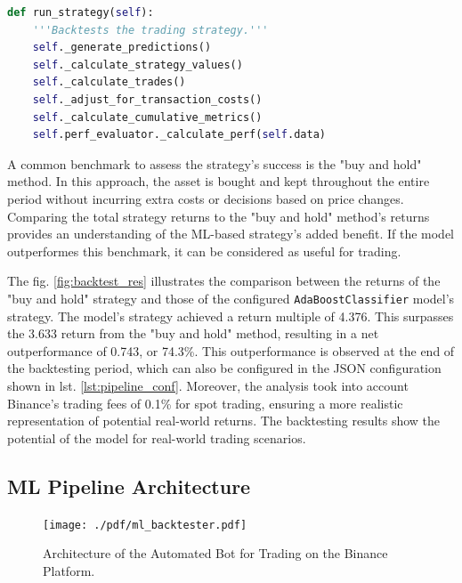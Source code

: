 \begin{lstlisting}[style=pythonstyle, language=Python, caption={\vspace*{1cm}Function of MlBacktester class for backtesting execution.},  captionpos=b, label=lst:add_features_function]
def run_strategy(self):
    '''Backtests the trading strategy.'''
    self._generate_predictions()
    self._calculate_strategy_values()
    self._calculate_trades()
    self._adjust_for_transaction_costs()
    self._calculate_cumulative_metrics()
    self.perf_evaluator._calculate_perf(self.data)

\end{lstlisting}

A common benchmark to assess the strategy's success is the "buy and hold" method.
In this approach, the asset is bought and kept throughout the entire period without incurring extra costs or decisions based on price changes.
Comparing the total strategy returns to the "buy and hold" method's returns provides an understanding of the ML-based strategy's added benefit.
If the model outperformes this benchmark, it can be considered as useful for trading.

The fig. \ref{fig:backtest_res} illustrates the comparison between the returns of the "buy and hold" strategy and those of the configured \texttt{AdaBoostClassifier} model's strategy.
The model's strategy achieved a return multiple of 4.376. This surpasses the 3.633 return from the "buy and hold" method, resulting in a net outperformance of 0.743, or 74.3\%.
This outperformance is observed at the end of the backtesting period, which can also be configured in the JSON configuration shown in lst. \ref{lst:pipeline_conf}.
Moreover, the analysis took into account Binance's trading fees of 0.1\% for spot trading, ensuring a more realistic representation of potential real-world returns.
The backtesting results show the potential of the model for real-world trading scenarios.


\subsection{ML Pipeline Architecture}

\begin{figure}[]
\centering
\texttt{[image: ./pdf/ml\_backtester.pdf]}
\caption{Architecture of the Automated Bot for Trading on the Binance Platform.}
\label{fig:ml_backtester}
\end{figure}

